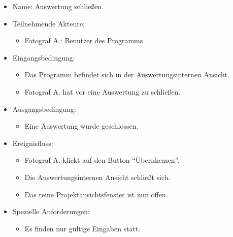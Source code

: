 \begin{itemize}
\item Name: Auswertung schließen.
\item Teilnehmende Akteure:
\begin{itemize}
\item Fotograf A.: Benutzer des Programms
\end{itemize}
\item Eingangsbedingung:
\begin{itemize}
\item Das Programm befindet sich in der Auswertungsinternen Ansicht.
\item Fotograf A. hat vor eine Auswertung zu schließen.
\end{itemize}
\item Ausgangsbedingung:
\begin{itemize}
\item Eine Auswertung wurde geschlossen.
\end{itemize}
\item Ereignisfluss:
\begin{itemize}
\item Fotograf A. klickt auf den Button "`Übernhemen"'.
\item Die Auswertungsinternen Ansicht schließt sich.
\item Das reine Projektansichtsfenster ist nun offen.
\end{itemize}
\item Spezielle Anforderungen:
\begin{itemize}
\item Es finden nur gültige Eingaben statt.
\end{itemize}
\end{itemize}